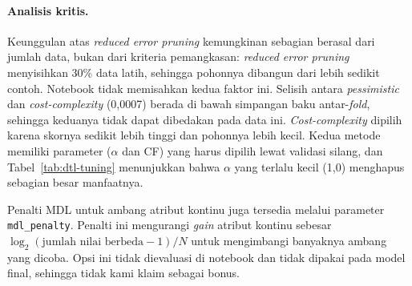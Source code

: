 \paragraph{Analisis kritis.} Keunggulan atas \textit{reduced error pruning} kemungkinan sebagian
berasal dari jumlah data, bukan dari kriteria pemangkasan: \textit{reduced error pruning} menyisihkan
30\% data latih, sehingga pohonnya dibangun dari lebih sedikit contoh. Notebook tidak memisahkan kedua
faktor ini. Selisih antara \textit{pessimistic} dan
\textit{cost-complexity} (0,0007) berada di bawah simpangan baku antar-\textit{fold}, sehingga
keduanya tidak dapat dibedakan pada data ini. \textit{Cost-complexity} dipilih karena skornya sedikit
lebih tinggi dan pohonnya lebih kecil. Kedua metode memiliki parameter ($\alpha$ dan CF) yang harus
dipilih lewat validasi silang, dan Tabel~\ref{tab:dtl-tuning} menunjukkan bahwa $\alpha$ yang terlalu
kecil (1,0) menghapus sebagian besar manfaatnya.

Penalti MDL untuk ambang atribut kontinu \cite{quinlan1996continuous} juga tersedia melalui parameter
\texttt{mdl\_penalty}. Penalti ini mengurangi \textit{gain} atribut kontinu sebesar
$\log_2(\text{jumlah nilai berbeda} - 1) / N$ untuk mengimbangi banyaknya ambang yang dicoba. Opsi ini
tidak dievaluasi di notebook dan tidak dipakai pada model final, sehingga tidak kami klaim sebagai
bonus.
